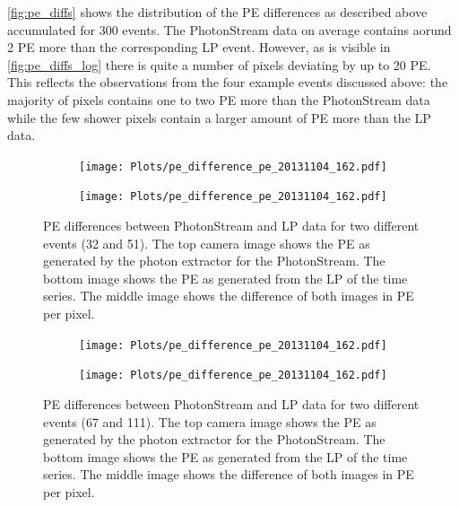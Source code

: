 \autoref{fig:pe_diffs} shows the distribution of the PE differences as
described above accumulated for 300 events. The PhotonStream data on average contains
aorund 2 PE more than the corresponding LP event. However, as is visible in
\autoref{fig:pe_diffs_log} there is quite a number of pixels deviating by up to
20 PE. This reflects the observations from the four example events discussed
above: the majority of pixels contains one to two PE more than the PhotonStream
data while the few shower pixels contain a larger amount of PE more than the LP
data.


%
\begin{figure}
  \begin{subfigure}{0.5\textwidth}
    \centering
    \texttt{[image: Plots/pe\_difference\_pe\_20131104\_162.pdf]}
  \end{subfigure}
  \begin{subfigure}{0.5\textwidth}
    \centering
    \texttt{[image: Plots/pe\_difference\_pe\_20131104\_162.pdf]}
  \end{subfigure}
  \caption{PE differences between PhotonStream and LP data for two different events (32 and 51). The top camera image
  shows the PE as generated by the photon extractor for the PhotonStream. The
  bottom image shows the PE as generated from the LP of the time series. The
  middle image shows the difference of both images in PE per pixel.}
  \label{fig:difference}
\end{figure}
%
%
\begin{figure}
  \begin{subfigure}{0.5\textwidth}
    \centering
    \texttt{[image: Plots/pe\_difference\_pe\_20131104\_162.pdf]}
  \end{subfigure}
  \begin{subfigure}{0.5\textwidth}
    \centering
    \texttt{[image: Plots/pe\_difference\_pe\_20131104\_162.pdf]}
  \end{subfigure}
  \caption{PE differences between PhotonStream and LP data for two different events (67 and 111). The top camera image
  shows the PE as generated by the photon extractor for the PhotonStream. The
  bottom image shows the PE as generated from the LP of the time series. The
  middle image shows the difference of both images in PE per pixel.}
  \label{fig:difference2}
\end{figure}



